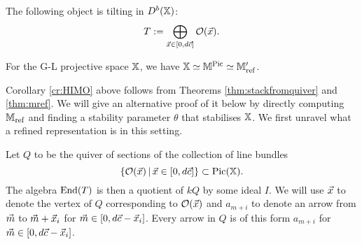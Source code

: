 \documentclass[12pt]{amsart}
\begin{document}
\begin{theorem}\cite[Theorem 6.1.2]{HIMO}
The following object is tilting in $D^b(\mathbb{X})$: $$T:= \bigoplus_{{\vec{x}} \in [0,d{\vec{c}}]} \mathcal{O}({\vec{x}}).$$
\end{theorem}

\begin{corollary} \label{cr:HIMO}
For the G-L projective space $\mathbb{X}$, we have $\mathbb{X} \simeq \mathbb{M}^{\operatorname{Pic}} \simeq \mathbb{M}'_\textup{ref}$.
\end{corollary}

Corollary \ref{cr:HIMO} above follows from Theorems \ref{thm:stackfromquiver} and \ref{thm:mref}.
We will give an alternative proof of it below by directly computing $\mathbb{M}_\text{ref}$ and finding a stability parameter $\theta$ that stabilises $\mathbb{X}$. We first unravel what a refined representation is in this setting.

Let $Q$ to be the quiver of sections of the collection of line bundles $$\{\mathcal{O}({\vec{x}})\,|\,{\vec{x}} \in [0,d{\vec{c}}]\}\subset \operatorname{Pic}(\mathbb{X}).$$
The algebra $\operatorname{End}(T)$ is then a quotient of $kQ$ by some ideal $I$.
We will use ${\vec{x}}$ to denote the vertex of $Q$ corresponding to $\mathcal{O}({\vec{x}})$ and $a_{m+i}$ to denote an arrow from ${\vec{m}}$ to ${\vec{m}}+{\vec{x}}_i$ for ${\vec{m}} \in [0, d{\vec{c}} - {\vec{x}}_i]$. Every arrow in $Q$ is of this form $a_{m+i}$ for ${\vec{m}} \in [0, d{\vec{c}} - {\vec{x}}_i]$.

\end{document}
